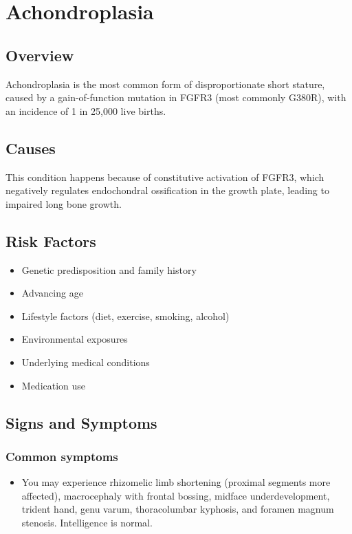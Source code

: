 \chapter{Achondroplasia}
\label{sec:Achondroplasia}

\section{Overview}
Achondroplasia is the most common form of disproportionate short stature, caused by a gain-of-function mutation in FGFR3 (most commonly G380R), with an incidence of 1 in 25,000 live births.
\section{Causes}
This condition happens because of constitutive activation of FGFR3, which negatively regulates endochondral ossification in the growth plate, leading to impaired long bone growth.     
\section{Risk Factors}

\begin{itemize}[noitemsep]
  \item Genetic predisposition and family history
  \item Advancing age
  \item Lifestyle factors (diet, exercise, smoking, alcohol)
  \item Environmental exposures
  \item Underlying medical conditions
  \item Medication use
\end{itemize}
\section{Signs and Symptoms}

\subsection{Common symptoms}
\begin{itemize}[noitemsep]
  \item You may experience rhizomelic limb shortening (proximal segments more affected), macrocephaly with frontal bossing, midface underdevelopment, trident hand, genu varum, thoracolumbar kyphosis, and foramen magnum stenosis. Intelligence is normal. 
  \end{itemize}


